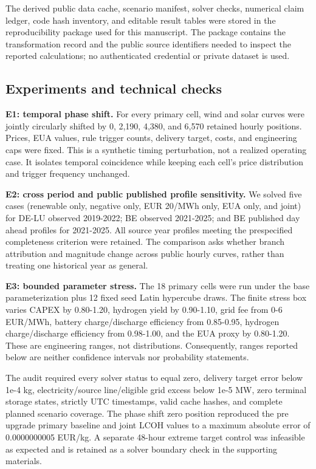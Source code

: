 \documentclass[largeformat]{interact}
\begin{document}
The derived public data cache, scenario manifest, solver checks,
numerical claim ledger, code hash inventory, and editable result tables
were stored in the reproducibility package used for this manuscript. The
package contains the transformation record and the public source
identifiers needed to inspect the reported calculations; no
authenticated credential or private dataset is used.

\subsection{Experiments and technical
checks}\label{experiments-and-technical-checks}

\textbf{E1: temporal phase shift.} For every primary cell, wind and
solar curves were jointly circularly shifted by 0, 2,190, 4,380, and
6,570 retained hourly positions. Prices, EUA values, rule trigger
counts, delivery target, costs, and engineering caps were fixed. This is
a synthetic timing perturbation, not a realized operating case. It
isolates temporal coincidence while keeping each cell's price
distribution and trigger frequency unchanged.

\textbf{E2: cross period and public published profile sensitivity.} We
solved five cases (renewable only, negative only, EUR 20/MWh only, EUA
only, and joint) for DE-LU observed 2019-2022; BE observed 2021-2025;
and BE published day ahead profiles for 2021-2025. All source year
profiles meeting the prespecified completeness criterion were retained.
The comparison asks whether branch attribution and magnitude change
across public hourly curves, rather than treating one historical year as
general.

\textbf{E3: bounded parameter stress.} The 18 primary cells were run
under the base parameterization plus 12 fixed seed Latin hypercube
draws. The finite stress box varies CAPEX by 0.80-1.20, hydrogen yield
by 0.90-1.10, grid fee from 0-6 EUR/MWh, battery charge/discharge
efficiency from 0.85-0.95, hydrogen charge/discharge efficiency from
0.98-1.00, and the EUA proxy by 0.80-1.20. These are engineering ranges,
not distributions. Consequently, ranges reported below are neither
confidence intervals nor probability statements.

The audit required every solver status to equal zero, delivery target
error below 1e-4 kg, electricity/source line/eligible grid excess below
1e-5 MW, zero terminal storage states, strictly UTC timestamps, valid
cache hashes, and complete planned scenario coverage. The phase shift
zero position reproduced the pre upgrade primary baseline and joint LCOH
values to a maximum absolute error of 0.0000000005 EUR/kg. A separate
48-hour extreme target control was infeasible as expected and is
retained as a solver boundary check in the supporting materials.
\end{document}
